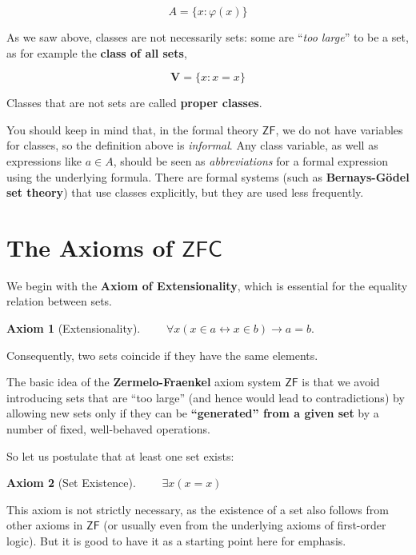 \documentclass{article}
\newcommand{\ZF}{\mathsf{ZF}}
\newtheorem{axiom}{Axiom}[section]
\begin{document}
\begin{equation}
A = \{x \colon \varphi(x)\}
\end{equation}

As we saw above, classes are not necessarily sets: some are ``\textit{too large}'' to be a set, as for example the \textbf{class of all sets},

\begin{equation}
\mathbf{V} = \{ x \colon x = x \}
\end{equation}

Classes that are not sets are called \textbf{proper classes}.

You should keep in mind that, in the formal theory $\ZF$, we do not have variables for classes, so the definition above is \textit{informal}.  Any class variable, as well as expressions like $a \in A$, should be seen as \textit{abbreviations} for a formal expression using the underlying formula.
There are formal systems (such as \textbf{Bernays-Gödel set theory}) that use classes explicitly, but they are used less frequently.

\section{The Axioms of $\mathsf{ZFC}$}

We begin with the \textbf{Axiom of Extensionality}, which is essential for the equality relation between sets.

\begin{axiom}[Extensionality]$\qquad \forall x (x \in a  \leftrightarrow x \in b)  \to a=b.$

\end{axiom}Consequently, two sets coincide if they have the same elements.

The basic idea of the \textbf{Zermelo-Fraenkel} axiom system $\ZF$ is that we avoid introducing sets that are ``too large'' (and hence would lead to contradictions) by allowing new sets only if they can be \textbf{``generated'' from a given set} by a number of fixed, well-behaved operations.

So let us postulate that at least one set exists:

\begin{axiom}[Set Existence]$\qquad \exists x ( x = x )$

\end{axiom}This axiom is not strictly necessary, as the existence of a set also follows from other axioms in $\ZF$ (or usually even from the underlying axioms of first-order logic). But it is good to have it as a starting point here for emphasis.
\end{document}
